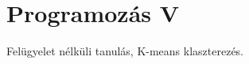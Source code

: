 \documentclass[../../main.tex]{subfiles}
\begin{document}
\section{Programozás V}

\begin{fulltheorem}
	Felügyelet nélküli tanulás, K-means klaszterezés.
\end{fulltheorem}
\end{document}
